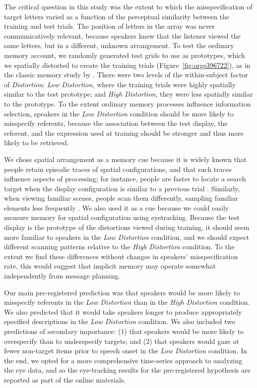 \documentclass[natbib,man,a4paper]{apa6}
\begin{document}
The critical question in this study was the extent to which the misspecification of target letters varied as a function of the perceptual similarity between the training and test trials. The position of letters in the array was never communicatively relevant, because speakers knew that the listener viewed the same letters, but in a different, unknown arrangement. To test the ordinary memory account, we randomly generated test grids to use as prototypes, which we spatially distorted to create the training trials (Figure~\ref{fig:orge396722}), as in the classic memory study by \cite{posner_keele_1968}. There were two levels of the within-subject factor of \emph{Distortion}: \emph{Low Distortion}, where the training trials were highly spatially similar to the test prototype; and \emph{High Distortion}, they were less spatially similar to the prototype. To the extent ordinary memory processes influence information selection, speakers in the \emph{Low Distortion} condition should be more likely to misspecify referents, because the association between the test display, the referent, and the expression used at training should be stronger and thus more likely to be retrieved.

We chose spatial arrangement as a memory cue because it is widely known that people retain episodic traces of spatial configurations, and that such traces influence aspects of processing; for instance, people are faster to locate a search target when the display configuration is similar to a previous trial \citep{chun_jiang_1998}.  Similarly, when viewing familiar scenes, people scan them differently, sampling familiar elements less frequently \citep{ryan2000amnesia}.  We also used it as a cue because we could easily measure memory for spatial configuration using eyetracking. Because the test display is the prototype of the distortions viewed during training, it should seem more familiar to speakers in the \emph{Low Distortion} condition, and we should expect different scanning patterns relative to the \emph{High Distortion} condition. To the extent we find these differences without changes in speakers' misspecification rate, this would suggest that implicit memory may operate somewhat independently from message planning.

Our main pre-registered prediction was that speakers would be more likely to misspecify referents in the \emph{Low Distortion} than in the \emph{High Distortion} condition. We also predicted that it would take speakers longer to produce appropriately specified descriptions in the \emph{Low Distortion} condition. We also included two predictions of secondary importance: (1) that speakers would be more likely to overspecify than to underspecify targets; and (2) that speakers would gaze at fewer non-target items prior to speech onset in the \emph{Low Distortion} condition. In the end, we opted for a more comprehensive time-series approach to analyzing the eye data, and so the eye-tracking results for the pre-registered hypothesis are reported as part of the online materials.
\end{document}
